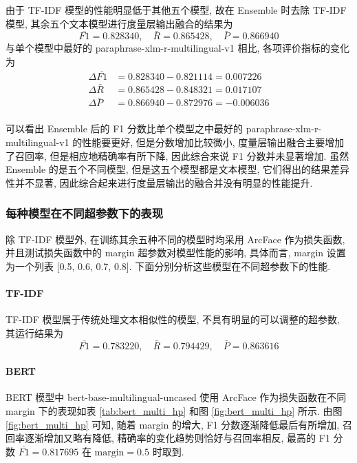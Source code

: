 \documentclass[12pt]{article}
\begin{document}
由于 TF-IDF 模型的性能明显低于其他五个模型, 故在 Ensemble 时去除 TF-IDF 模型, 其余五个文本模型进行度量层输出融合的结果为
\begin{equation}
  \overline{F1}=0.828340,\quad\bar{R}=0.865428,\quad\bar{P}=0.866940
\end{equation}
与单个模型中最好的 paraphrase-xlm-r-multilingual-v1 相比, 各项评价指标的变化为
\begin{equation}
  \begin{aligned}
    \Delta\overline{F1}&=0.828340-0.821114=0.007226\\
    \Delta\bar{R}&=0.865428-0.848321=0.017107\\
    \Delta\bar{P}&=0.866940-0.872976=-0.006036\\
  \end{aligned}
\end{equation}

可以看出 Ensemble 后的 F1 分数比单个模型之中最好的 paraphrase-xlm-r-multilingual-v1 的性能要更好, 但是分数增加比较微小, 度量层输出融合主要增加了召回率, 但是相应地精确率有所下降, 因此综合来说 F1 分数并未显著增加. 虽然 Ensemble 的是五个不同模型, 但是这五个模型都是文本模型, 它们得出的结果差异性并不显著, 因此综合起来进行度量层输出的融合并没有明显的性能提升.

\subsubsection{每种模型在不同超参数下的表现}

除 TF-IDF 模型外, 在训练其余五种不同的模型时均采用 ArcFace 作为损失函数, 并且测试损失函数中的 margin 超参数对模型性能的影响, 具体而言, margin 设置为一个列表 [0.5, 0.6, 0.7, 0.8]. 下面分别分析这些模型在不同超参数下的性能.

\paragraph{TF-IDF}

TF-IDF 模型属于传统处理文本相似性的模型, 不具有明显的可以调整的超参数, 其运行结果为
\begin{equation}
  \overline{F1}=0.783220,\quad\bar{R}=0.794429,\quad\bar{P}=0.863616
\end{equation}

\paragraph{BERT}

BERT 模型中 bert-base-multilingual-uncased 使用 ArcFace 作为损失函数在不同 margin 下的表现如表 \ref{tab:bert_multi_hp} 和图 \ref{fig:bert_multi_hp} 所示. 由图 \ref{fig:bert_multi_hp} 可知, 随着 margin 的增大, F1 分数逐渐降低最后有所增加, 召回率逐渐增加又略有降低, 精确率的变化趋势则恰好与召回率相反, 最高的 F1 分数 $\overline{F1}=0.817695$ 在 $\text{margin} = 0.5$ 时取到.
\end{document}
